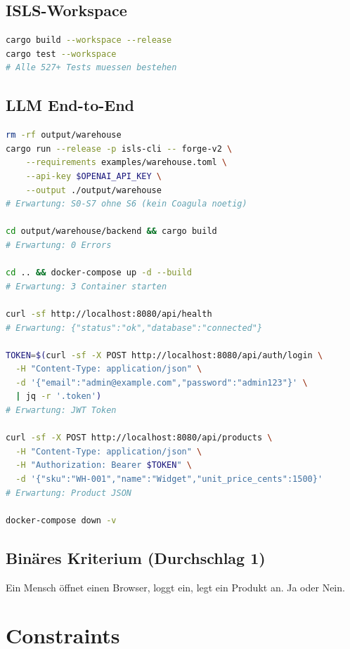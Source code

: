 \documentclass[11pt,a4paper]{article}
\begin{document}
\subsection{ISLS-Workspace}

\begin{lstlisting}[language=bash]
cargo build --workspace --release
cargo test --workspace
# Alle 527+ Tests muessen bestehen
\end{lstlisting}

\subsection{LLM End-to-End}

\begin{lstlisting}[language=bash]
rm -rf output/warehouse
cargo run --release -p isls-cli -- forge-v2 \
    --requirements examples/warehouse.toml \
    --api-key $OPENAI_API_KEY \
    --output ./output/warehouse
# Erwartung: S0-S7 ohne S6 (kein Coagula noetig)

cd output/warehouse/backend && cargo build
# Erwartung: 0 Errors

cd .. && docker-compose up -d --build
# Erwartung: 3 Container starten

curl -sf http://localhost:8080/api/health
# Erwartung: {"status":"ok","database":"connected"}

TOKEN=$(curl -sf -X POST http://localhost:8080/api/auth/login \
  -H "Content-Type: application/json" \
  -d '{"email":"admin@example.com","password":"admin123"}' \
  | jq -r '.token')
# Erwartung: JWT Token

curl -sf -X POST http://localhost:8080/api/products \
  -H "Content-Type: application/json" \
  -H "Authorization: Bearer $TOKEN" \
  -d '{"sku":"WH-001","name":"Widget","unit_price_cents":1500}'
# Erwartung: Product JSON

docker-compose down -v
\end{lstlisting}

\subsection{Binäres Kriterium (Durchschlag 1)}

Ein Mensch öffnet einen Browser, loggt ein, legt ein Produkt an.
Ja oder Nein.

\section{Constraints}
\end{document}
